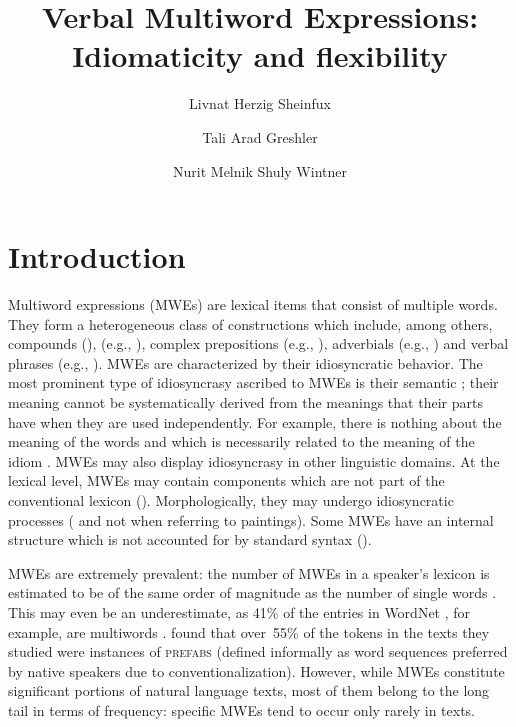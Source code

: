 \documentclass[output=paper]{langsci/langscibook}
\title{Verbal Multiword Expressions: Idiomaticity and flexibility}
\author{%
 Livnat Herzig Sheinfux\affiliation{University of Haifa}\and
 Tali Arad Greshler\affiliation{University of Haifa}\and
 Nurit Melnik\affiliation{The Open University of Israel}\lastand
 Shuly Wintner\affiliation{University of Haifa}
}
\begin{document}
\section{Introduction}
\label{she:sec:introduction}

Multiword expressions (MWEs) are lexical items that consist of
multiple words. They form a heterogeneous class of
constructions which include, among others, compounds (),  (e.g., ), complex
prepositions (e.g., ), adverbials (e.g., )
and verbal phrases (e.g., ). MWEs are characterized
by their idiosyncratic behavior. The most prominent type of
idiosyncrasy ascribed to MWEs is their semantic ; their
meaning cannot be systematically derived from the meanings that their
parts have when they are used independently.
For example, there is nothing about the meaning of the words  and  which is necessarily related to the meaning of the idiom .
MWEs may also display idiosyncrasy in other linguistic
domains. At the lexical level, MWEs may contain components which are
not part of the conventional lexicon (). Morphologically, they may undergo idiosyncratic processes
( and not  when referring to
paintings). Some MWEs have an internal structure which is not
accounted for by standard syntax ().

MWEs are extremely prevalent: the number of MWEs in a speaker's
lexicon is estimated to be of the same order of magnitude as the
number of single words \citep{jackendoff1997architecture}. This may even be an
underestimate, as 41\% of the entries in WordNet \citep{wordnet}, for
example, are multiwords \citep{sag02}.
\citet{erman:warren:2000} found that over~55\% of the tokens in the
texts they studied were instances of {\scshape prefabs} (defined
informally as word sequences preferred by native speakers due to
conventionalization).  However, while MWEs constitute significant
portions of natural language texts, most of them belong to the long
tail in terms of frequency: specific MWEs tend to occur only rarely in
texts.
\end{document}
